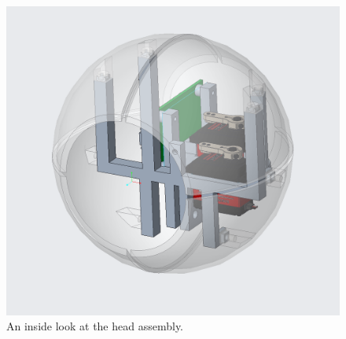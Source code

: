 \begin{figure}[h]
    \centering
    \includegraphics[width=0.5\linewidth]{Thesis/ch2/head-diagram.png}
    \caption{An inside look at the head assembly.}
    \label{fig:head-diagram}
\end{figure}

